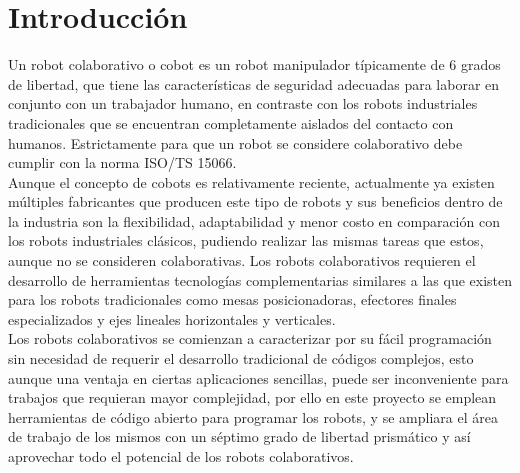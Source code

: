 \section{Introducción}
Un robot colaborativo o cobot es un robot manipulador típicamente de 6 grados de libertad, que tiene las características de seguridad adecuadas para laborar en conjunto con un trabajador humano, en contraste con los robots industriales tradicionales que se encuentran completamente aislados del contacto con humanos. Estrictamente para que un robot se considere colaborativo debe cumplir con la norma ISO/TS 15066\cite{cobots}.\\
Aunque el concepto de cobots es relativamente reciente, actualmente ya existen múltiples fabricantes que producen este tipo de robots y sus beneficios dentro de la industria son la flexibilidad, adaptabilidad y menor costo en comparación con los robots industriales clásicos, pudiendo realizar las mismas tareas que estos, aunque no se consideren colaborativas. Los robots colaborativos requieren el desarrollo de herramientas tecnologías complementarias similares a las que existen para los robots tradicionales como mesas posicionadoras, efectores finales especializados y ejes lineales horizontales y verticales.\\
Los robots colaborativos se comienzan a caracterizar por su fácil programación sin necesidad de requerir el desarrollo tradicional de códigos complejos, esto aunque una ventaja en ciertas aplicaciones sencillas, puede ser inconveniente para trabajos que requieran mayor complejidad, por ello en este proyecto se emplean herramientas de código abierto para programar los robots, y se ampliara el área de trabajo de los mismos con un séptimo grado de libertad prismático y así aprovechar todo el potencial de los robots colaborativos.
